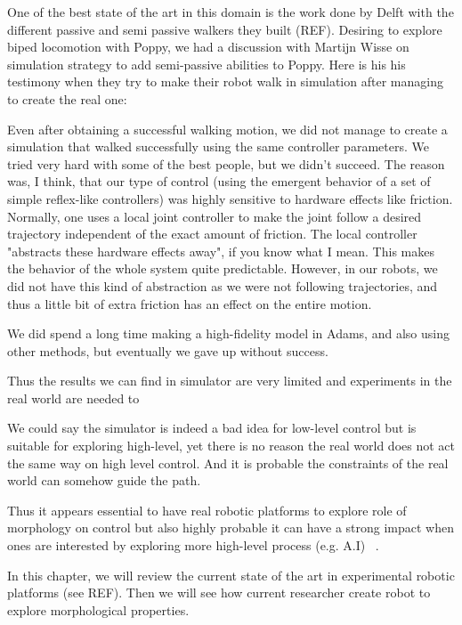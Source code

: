 One of the best state of the art in this domain is the work done by Delft with the different passive and semi passive walkers they built (REF). Desiring to explore biped locomotion with Poppy, we had a discussion with Martijn Wisse on simulation strategy to add semi-passive abilities to Poppy. Here is his his testimony when they try to make their robot walk in simulation after managing to create the real one:

\begin{formal}

Even after obtaining a successful walking motion, we did not manage to create a simulation that walked successfully using the same controller parameters. We tried very hard with some of the best people, but we didn’t succeed. The reason was, I think, that our type of control (using the emergent behavior of a set of simple reflex-like controllers) was highly sensitive to hardware effects like friction. Normally, one uses a local joint controller to make the joint follow a desired trajectory independent of the exact amount of friction. The local controller "abstracts these hardware effects away", if you know what I mean. This makes the behavior of the whole system quite predictable. However, in our robots, we did not have this kind of abstraction as we were not following trajectories, and thus a little bit of extra friction has an effect on the entire motion.

We did spend a long time making a high-fidelity model in Adams, and also using other methods, but eventually we gave up without success.

\end{formal}

Thus the results we can find in simulator are very limited and experiments in the real world are needed to

We could say the simulator is indeed a bad idea for low-level control but is suitable for exploring high-level, yet there is no reason the real world does not act the same way on high level control. And it is probable the constraints of the real world can somehow guide the path.

Thus it appears essential to have real robotic platforms to explore role of morphology on control but also highly probable it can have a strong impact when ones are interested by exploring more high-level process (e.g. A.I) ~\parencite{lakoff2000mathematics}.


In this chapter, we will review the current state of the art in experimental robotic platforms (see REF). Then we will see how current researcher create robot to explore morphological properties.

